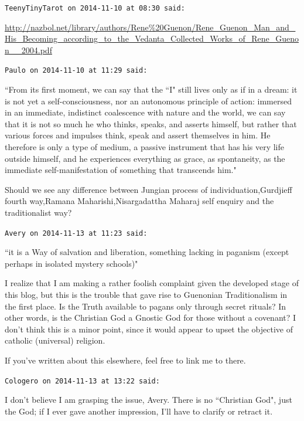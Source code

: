 \begin{footnotesize}\begin{sffamily}



\texttt{TeenyTinyTarot on 2014-11-10 at 08:30 said: }

\url{http://nazbol.net/library/authors/Rene\%20Guenon/Rene\_Guenon\_Man\_and\_His\_Becoming\_according\_to\_the\_Vedanta\_Collected\_Works\_of\_Rene\_Guenon\_\_2004.pdf}


\hfill

\texttt{Paulo on 2014-11-10 at 11:29 said: }

``From its first moment, we can say that the ``I" still lives only as if in a dream: it is not yet a self-consciousness, nor an autonomous principle of action: immersed in an immediate, indistinct coalescence with nature and the world, we can say that it is not so much he who thinks, speaks, and asserts himself, but rather that various forces and impulses think, speak and assert themselves in him. He therefore is only a type of medium, a passive instrument that has his very life outside himself, and he experiences everything as grace, as spontaneity, as the immediate self-manifestation of something that transcends him."

Should we see any difference between Jungian process of individuation,Gurdjieff fourth way,Ramana Maharishi,Nisargadattha Maharaj self enquiry and the traditionalist way?


\hfill

\texttt{Avery on 2014-11-13 at 11:23 said: }

``it is a Way of salvation and liberation, something lacking in paganism (except perhaps in isolated mystery schools)"

I realize that I am making a rather foolish complaint given the developed stage of this blog, but this is the trouble that gave rise to Guenonian Traditionalism in the first place. Is the Truth available to pagans only through secret rituals? In other words, is the Christian God a Gnostic God for those without a covenant? I don't think this is a minor point, since it would appear to upset the objective of catholic (universal) religion.

If you've written about this elsewhere, feel free to link me to there.


\hfill

\texttt{Cologero on 2014-11-13 at 13:22 said: }

I don't believe I am grasping the issue, Avery. There is no ``Christian God", just the God; if I ever gave another impression, I'll have to clarify or retract it.


\end{sffamily}
\end{footnotesize}

